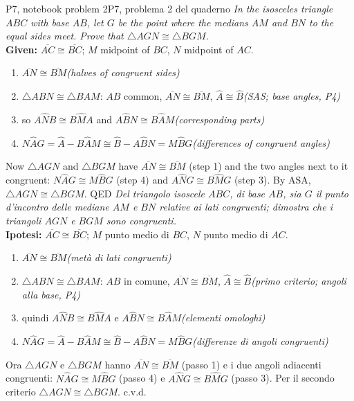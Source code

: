 \documentclass[10pt,a4paper,oneside]{book}
\newcommand{\ang}[3]{#1\widehat{#2}#3}      %
\newcommand{\av}[1]{\widehat{#1}}           %
\newcommand{\seg}[1]{\overline{#1}}         %
\newcommand{\tri}[1]{\triangle #1}          %
\newcommand{\step}[2]{\item #1\hfill{\small\color{slate}\itshape(#2)}}
\newenvironment{steps}{\begin{enumerate}[label=\arabic*., leftmargin=1.5em, itemsep=1pt]}{\end{enumerate}}
\begin{document}
\begin{proofbox}{P7, notebook problem 2}{P7, problema 2 del quaderno}
\emph{In the isosceles triangle $ABC$ with base $AB$, let $G$ be the point where the medians $AM$ and $BN$ to the equal sides meet. Prove that $\tri{AGN} \cong \tri{BGM}$.}\\
\textbf{Given:} $\seg{AC} \cong \seg{BC}$; $M$ midpoint of $BC$, $N$ midpoint of $AC$.
\begin{steps}
\step{$\seg{AN} \cong \seg{BM}$}{halves of congruent sides}
\step{$\tri{ABN} \cong \tri{BAM}$: $AB$ common, $\seg{AN} \cong \seg{BM}$, $\av{A} \cong \av{B}$}{SAS; base angles, P4}
\step{so $\ang{A}{N}{B} \cong \ang{B}{M}{A}$ and $\ang{A}{B}{N} \cong \ang{B}{A}{M}$}{corresponding parts}
\step{$\ang{N}{A}{G} = \av{A} - \ang{B}{A}{M} \cong \av{B} - \ang{A}{B}{N} = \ang{M}{B}{G}$}{differences of congruent angles}
\end{steps}
Now $\tri{AGN}$ and $\tri{BGM}$ have $\seg{AN} \cong \seg{BM}$ (step 1) and the two angles next to it congruent: $\ang{N}{A}{G} \cong \ang{M}{B}{G}$ (step 4) and $\ang{A}{N}{G} \cong \ang{B}{M}{G}$ (step 3). By ASA, $\tri{AGN} \cong \tri{BGM}$. \hfill QED
\tcblower
\emph{Del triangolo isoscele $ABC$, di base $AB$, sia $G$ il punto d'incontro delle mediane $AM$ e $BN$ relative ai lati congruenti; dimostra che i triangoli $AGN$ e $BGM$ sono congruenti.}\\
\textbf{Ipotesi:} $\seg{AC} \cong \seg{BC}$; $M$ punto medio di $BC$, $N$ punto medio di $AC$.
\begin{steps}
\step{$\seg{AN} \cong \seg{BM}$}{metà di lati congruenti}
\step{$\tri{ABN} \cong \tri{BAM}$: $AB$ in comune, $\seg{AN} \cong \seg{BM}$, $\av{A} \cong \av{B}$}{primo criterio; angoli alla base, P4}
\step{quindi $\ang{A}{N}{B} \cong \ang{B}{M}{A}$ e $\ang{A}{B}{N} \cong \ang{B}{A}{M}$}{elementi omologhi}
\step{$\ang{N}{A}{G} = \av{A} - \ang{B}{A}{M} \cong \av{B} - \ang{A}{B}{N} = \ang{M}{B}{G}$}{differenze di angoli congruenti}
\end{steps}
Ora $\tri{AGN}$ e $\tri{BGM}$ hanno $\seg{AN} \cong \seg{BM}$ (passo 1) e i due angoli adiacenti congruenti: $\ang{N}{A}{G} \cong \ang{M}{B}{G}$ (passo 4) e $\ang{A}{N}{G} \cong \ang{B}{M}{G}$ (passo 3). Per il secondo criterio $\tri{AGN} \cong \tri{BGM}$. \hfill c.v.d.
\end{proofbox}
\end{document}
